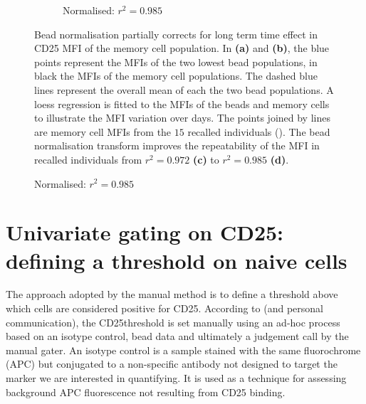 \begin{figure}
\begin{subfigure}[b]{.4\textwidth}
    \caption{Normalised: $r^2=0.985$}
\end{subfigure}
{Bead normalisation partially corrects for long term time effect in CD25 MFI of the memory cell population.}
{
  In \textbf{(a)} and \textbf{(b)}, the blue points represent the  MFIs of the two lowest bead populations,
  in black the  MFIs of the memory cell populations.
  The dashed blue lines represent the overall mean of each the two bead populations.
  A loess regression is fitted to the MFIs of the beads and memory cells to illustrate the MFI variation over days.
  The points joined by lines are memory cell  MFIs from the $15$ recalled individuals ().
  The bead normalisation transform  improves the repeatability of the MFI in recalled individuals from $r^2=0.972$ \textbf{(c)} to $r^2=0.985$ \textbf{(d)}.
}
\end{figure}




\section{Univariate gating on CD25: defining a \positive threshold on naive cells}

The approach adopted by the manual method is to define a threshold above which cells are considered positive for CD25.
According to \citet{Dendrou:2009dv} (and  personal communication),
the CD25\positive threshold is set manually using an ad-hoc process based on an isotype control, bead data and ultimately a judgement call
by the manual gater.
An isotype control is a sample stained with the same fluorochrome (APC) but conjugated to a
non-specific antibody not designed to target the marker we are interested in quantifying.
It is used as a technique for assessing background APC fluorescence not resulting from CD25 binding.


